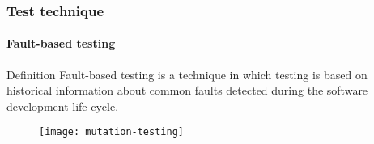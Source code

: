 \begin{frame}[imacidii]
\frametitle{Test technique}
\framesubtitle{Fault-based testing}
\label{concept:fault-based-testing}

\begin{block:concept}{Definition}
Fault-based testing is a technique in which testing is based on
historical information about common faults detected during the software
development life cycle.
\end{block:concept}

\begin{figure}
    \centering
    \texttt{[image: mutation-testing]}
\end{figure}
\end{frame}
